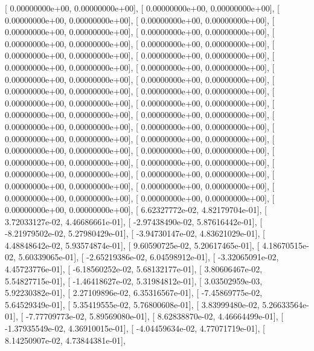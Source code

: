 \documentclass{article}
\begin{document}
       [  0.00000000e+00,   0.00000000e+00],
       [  0.00000000e+00,   0.00000000e+00],
       [  0.00000000e+00,   0.00000000e+00],
       [  0.00000000e+00,   0.00000000e+00],
       [  0.00000000e+00,   0.00000000e+00],
       [  0.00000000e+00,   0.00000000e+00],
       [  0.00000000e+00,   0.00000000e+00],
       [  0.00000000e+00,   0.00000000e+00],
       [  0.00000000e+00,   0.00000000e+00],
       [  0.00000000e+00,   0.00000000e+00],
       [  0.00000000e+00,   0.00000000e+00],
       [  0.00000000e+00,   0.00000000e+00],
       [  0.00000000e+00,   0.00000000e+00],
       [  0.00000000e+00,   0.00000000e+00],
       [  0.00000000e+00,   0.00000000e+00],
       [  0.00000000e+00,   0.00000000e+00],
       [  0.00000000e+00,   0.00000000e+00],
       [  0.00000000e+00,   0.00000000e+00],
       [  0.00000000e+00,   0.00000000e+00],
       [  0.00000000e+00,   0.00000000e+00],
       [  0.00000000e+00,   0.00000000e+00],
       [  0.00000000e+00,   0.00000000e+00],
       [  0.00000000e+00,   0.00000000e+00],
       [  0.00000000e+00,   0.00000000e+00],
       [  0.00000000e+00,   0.00000000e+00],
       [  0.00000000e+00,   0.00000000e+00],
       [  0.00000000e+00,   0.00000000e+00],
       [  0.00000000e+00,   0.00000000e+00],
       [  0.00000000e+00,   0.00000000e+00],
       [  0.00000000e+00,   0.00000000e+00],
       [  0.00000000e+00,   0.00000000e+00],
       [  0.00000000e+00,   0.00000000e+00],
       [  0.00000000e+00,   0.00000000e+00],
       [  0.00000000e+00,   0.00000000e+00],
       [  0.00000000e+00,   0.00000000e+00],
       [  6.62327772e-02,   4.82179704e-01],
       [  3.72033127e-02,   4.46686661e-01],
       [ -2.97438490e-02,   5.87616442e-01],
       [ -8.21979502e-02,   5.27980429e-01],
       [ -3.94730147e-02,   4.83621029e-01],
       [  4.48848642e-02,   5.93574874e-01],
       [  9.60590725e-02,   5.20617465e-01],
       [  4.18670515e-02,   5.60339065e-01],
       [ -2.65219386e-02,   6.04598912e-01],
       [ -3.32065091e-02,   4.45723776e-01],
       [ -6.18560252e-02,   5.68132177e-01],
       [  3.80606467e-02,   5.54827715e-01],
       [ -1.46418627e-02,   5.31984812e-01],
       [  3.03502959e-03,   5.92230382e-01],
       [  2.27109896e-02,   6.35316567e-01],
       [ -7.45869775e-02,   5.64529349e-01],
       [  5.35419555e-02,   5.76800608e-01],
       [  3.83999480e-02,   5.26633564e-01],
       [ -7.77709773e-02,   5.89569080e-01],
       [  8.62838870e-02,   4.46664499e-01],
       [ -1.37935549e-02,   4.36910015e-01],
       [ -4.04459634e-02,   4.77071719e-01],
       [  8.14250907e-02,   4.73844381e-01],
\end{document}

